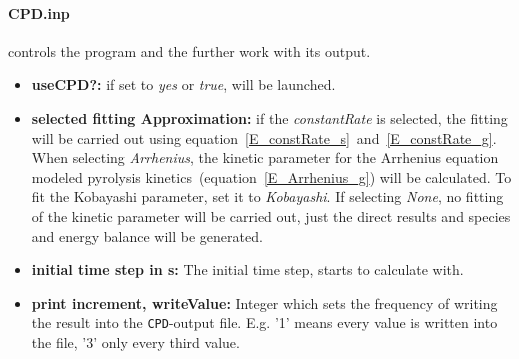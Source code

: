 \paragraph{CPD.inp} controls the \CPD program and the further work with its output.
\begin{itemize}
 \item \textbf{useCPD?:} if set to \emph{yes} or \emph{true}, \CPD will be launched.
 \item \textbf{selected fitting Approximation:} if the \emph{constantRate} is selected, the fitting will be carried out using equation~\ref{E_constRate_s}~and~\ref{E_constRate_g}. When selecting \emph{Arrhenius}, the kinetic parameter for the Arrhenius equation modeled pyrolysis kinetics~(equation~\ref{E_Arrhenius_g}) will be calculated. To fit the Kobayashi parameter, set it to \emph{Kobayashi}. If selecting \emph{None}, no fitting of the kinetic parameter will be carried out, just the direct \CPD results and species and energy balance will be generated.
 \item \textbf{initial time step in s:} The initial time step, \CPD starts to calculate with.
\item \textbf{print increment, writeValue:} Integer which sets the frequency of writing the result into the \texttt{CPD}-output file. E.g. '1' means every value is written into the file, '3' only every third value.
\end{itemize}

